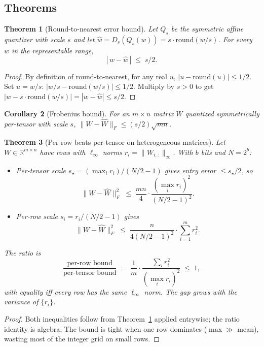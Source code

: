 \documentclass[11pt]{article}
\newtheorem{theorem}{Theorem}[section]
\newtheorem{corollary}[theorem]{Corollary}
\theoremstyle{remark}
\begin{document}
\subsection*{Theorems}

\begin{theorem}[Round-to-nearest error bound]\label{thm:rtn}
Let $Q_s$ be the symmetric affine quantizer with scale $s$ and let $\widehat w = D_s(Q_s(w)) = s\cdot\mathrm{round}(w/s)$. For every $w$ in the representable range,
\[
|\,w - \widehat w\,| \;\le\; s/2.
\]
\end{theorem}

\begin{proof}
By definition of round-to-nearest, for any real $u$, $|u - \mathrm{round}(u)|\le 1/2$. Set $u=w/s$: $|w/s - \mathrm{round}(w/s)|\le 1/2$. Multiply by $s>0$ to get $|w - s\cdot\mathrm{round}(w/s)| = |w - \widehat w|\le s/2$.
\end{proof}

\begin{corollary}[Frobenius bound]\label{cor:frob}
For an $m\times n$ matrix $W$ quantized symmetrically per-tensor with scale $s$, $\|W-\widehat W\|_F \le (s/2)\sqrt{mn}$.
\end{corollary}

\begin{theorem}[Per-row beats per-tensor on heterogeneous matrices]\label{thm:perrow}
Let $W\in\mathbb{R}^{m\times n}$ have rows with $\ell_\infty$ norms $r_i = \|W_{i,:}\|_\infty$. With $b$ bits and $N=2^b$:
\begin{itemize}
\item \emph{Per-tensor} scale $s_\star = (\max_i r_i)/(N/2-1)$ gives entry error $\le s_\star/2$, so
\[
\|W-\widehat W\|_F^2 \;\le\; \frac{mn}{4}\cdot\frac{(\max_i r_i)^2}{(N/2-1)^2}.
\]
\item \emph{Per-row} scale $s_i = r_i/(N/2-1)$ gives
\[
\|W-\widehat W\|_F^2 \;\le\; \frac{n}{4(N/2-1)^2}\cdot\sum_{i=1}^m r_i^2.
\]
\end{itemize}
The ratio is
\[
\frac{\text{per-row bound}}{\text{per-tensor bound}} \;=\; \frac{1}{m}\cdot\frac{\sum_i r_i^2}{(\max_i r_i)^2} \;\le\; 1,
\]
with equality iff every row has the same $\ell_\infty$ norm. The gap grows with the variance of $\{r_i\}$.
\end{theorem}

\begin{proof}
Both inequalities follow from Theorem~\ref{thm:rtn} applied entrywise; the ratio identity is algebra. The bound is tight when one row dominates ($\max\gg$ mean), wasting most of the integer grid on small rows.
\end{proof}
\end{document}
